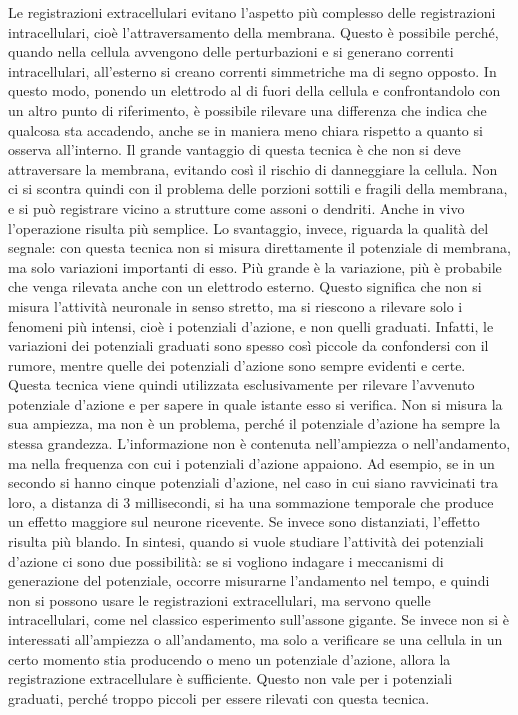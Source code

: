 Le registrazioni extracellulari evitano l’aspetto più complesso delle registrazioni intracellulari, cioè l’attraversamento della membrana. Questo è possibile perché, quando nella cellula avvengono delle perturbazioni e si generano correnti intracellulari, all’esterno si creano correnti simmetriche ma di segno opposto. In questo modo, ponendo un elettrodo al di fuori della cellula e confrontandolo con un altro punto di riferimento, è possibile rilevare una differenza che indica che qualcosa sta accadendo, anche se in maniera meno chiara rispetto a quanto si osserva all’interno.
Il grande vantaggio di questa tecnica è che non si deve attraversare la membrana, evitando così il rischio di danneggiare la cellula. Non ci si scontra quindi con il problema delle porzioni sottili e fragili della membrana, e si può registrare vicino a strutture come assoni o dendriti. Anche in vivo l’operazione risulta più semplice. Lo svantaggio, invece, riguarda la qualità del segnale: con questa tecnica non si misura direttamente il potenziale di membrana, ma solo variazioni importanti di esso. Più grande è la variazione, più è probabile che venga rilevata anche con un elettrodo esterno. Questo significa che non si misura l’attività neuronale in senso stretto, ma si riescono a rilevare solo i fenomeni più intensi, cioè i potenziali d’azione, e non quelli graduati. Infatti, le variazioni dei potenziali graduati sono spesso così piccole da confondersi con il rumore, mentre quelle dei potenziali d’azione sono sempre evidenti e certe. Questa tecnica viene quindi utilizzata esclusivamente per rilevare l’avvenuto potenziale d’azione e per sapere in quale istante esso si verifica. Non si misura la sua ampiezza, ma non è un problema, perché il potenziale d’azione ha sempre la stessa grandezza. L’informazione non è contenuta nell’ampiezza o nell’andamento, ma nella frequenza con cui i potenziali d’azione appaiono. Ad esempio, se in un secondo si hanno cinque potenziali d’azione, nel caso in cui siano ravvicinati tra loro, a distanza di 3 millisecondi, si ha una sommazione temporale che produce un effetto maggiore sul neurone ricevente. Se invece sono distanziati, l’effetto risulta più blando.
In sintesi, quando si vuole studiare l’attività dei potenziali d’azione ci sono due possibilità: se si vogliono indagare i meccanismi di generazione del potenziale, occorre misurarne l’andamento nel tempo, e quindi non si possono usare le registrazioni extracellulari, ma servono quelle intracellulari, come nel classico esperimento sull’assone gigante. Se invece non si è interessati all’ampiezza o all’andamento, ma solo a verificare se una cellula in un certo momento stia producendo o meno un potenziale d’azione, allora la registrazione extracellulare è sufficiente. Questo non vale per i potenziali graduati, perché troppo piccoli per essere rilevati con questa tecnica.

